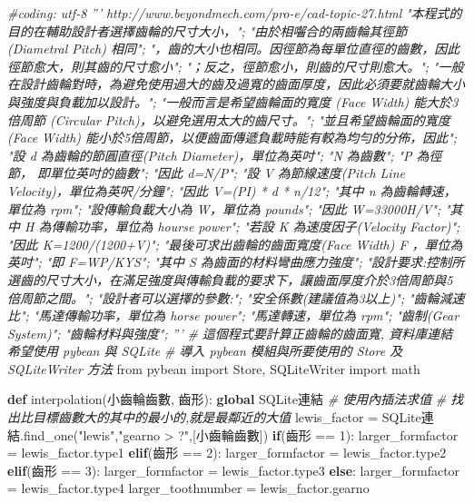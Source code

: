 \documentclass[]{article}
\newenvironment{Shaded}{}{}
\newcommand{\KeywordTok}[1]{\textcolor[rgb]{0.00,0.44,0.13}{\textbf{{#1}}}}
\newcommand{\DecValTok}[1]{\textcolor[rgb]{0.25,0.63,0.44}{{#1}}}
\newcommand{\CharTok}[1]{\textcolor[rgb]{0.25,0.44,0.63}{{#1}}}
\newcommand{\StringTok}[1]{\textcolor[rgb]{0.25,0.44,0.63}{{#1}}}
\newcommand{\CommentTok}[1]{\textcolor[rgb]{0.38,0.63,0.69}{\textit{{#1}}}}
\newcommand{\NormalTok}[1]{{#1}}
\begin{document}
\begin{Shaded}
\begin{Highlighting}[]
\CommentTok{#coding: utf-8}
\CommentTok{'''}
\CommentTok{http://www.beyondmech.com/pro-e/cad-topic-27.html}
\CommentTok{"本程式的目的在輔助設計者選擇齒輪的尺寸大小，";}
\CommentTok{"由於相囓合的兩齒輪其徑節 (Diametral Pitch) 相同";}
\CommentTok{"，齒的大小也相同。因徑節為每單位直徑的齒數，因此徑節愈大，則其齒的尺寸愈小";}
\CommentTok{"；反之，徑節愈小，則齒的尺寸則愈大。";}
\CommentTok{"一般在設計齒輪對時，為避免使用過大的齒及過寬的齒面厚度，因此必須要就齒輪大小與強度與負載加以設計。";}
\CommentTok{"一般而言是希望齒輪面的寬度 (Face Width) 能大於3倍周節 (Circular Pitch)，以避免選用太大的齒尺寸。";}
\CommentTok{"並且希望齒輪面的寬度 (Face Width) 能小於5倍周節，以便齒面傳遞負載時能有較為均勻的分佈，因此";}
\CommentTok{"設 d 為齒輪的節圓直徑(Pitch Diameter)，單位為英吋";}
\CommentTok{"N 為齒數";}
\CommentTok{"P 為徑節， 即單位英吋的齒數";}
\CommentTok{"因此 d=N/P";}
\CommentTok{"設 V 為節線速度(Pitch Line Velocity)，單位為英呎/分鐘";}
\CommentTok{"因此 V=(PI) * d * n/12";}
\CommentTok{"其中 n 為齒輪轉速，單位為 rpm";}
\CommentTok{"設傳輸負載大小為 W，單位為 pounds";}
\CommentTok{"因此 W=33000H/V";}
\CommentTok{"其中 H 為傳輸功率，單位為 hourse power";}
\CommentTok{"若設 K 為速度因子(Velocity Factor)";}
\CommentTok{"因此 K=1200/(1200+V)";}
\CommentTok{"最後可求出齒輪的齒面寬度(Face Width) F ，單位為英吋";}
\CommentTok{"即 F=WP/KYS";}
\CommentTok{"其中 S 為齒面的材料彎曲應力強度";}
\CommentTok{"設計要求:控制所選齒的尺寸大小，在滿足強度與傳輸負載的要求下，讓齒面厚度介於3倍周節與5倍周節之間。";}
\CommentTok{"設計者可以選擇的參數:";}
\CommentTok{"安全係數(建議值為3以上)";}
\CommentTok{"齒輪減速比";}
\CommentTok{"馬達傳輸功率，單位為 horse power";}
\CommentTok{"馬達轉速，單位為 rpm";}
\CommentTok{"齒制(Gear System)";}
\CommentTok{"齒輪材料與強度";}
\CommentTok{'''}
\CommentTok{# 這個程式要計算正齒輪的齒面寬, 資料庫連結希望使用 pybean 與 SQLite}
\CommentTok{# 導入 pybean 模組與所要使用的 Store 及 SQLiteWriter 方法}
\CharTok{from} \NormalTok{pybean }\CharTok{import} \NormalTok{Store, SQLiteWriter}
\CharTok{import} \NormalTok{math}

\KeywordTok{def} \NormalTok{interpolation(小齒輪齒數, 齒形):}
    \KeywordTok{global} \NormalTok{SQLite連結}
    \CommentTok{# 使用內插法求值}
    \CommentTok{# 找出比目標齒數大的其中的最小的,就是最鄰近的大值}
    \NormalTok{lewis_factor = SQLite連結.find_one(}\StringTok{"lewis"}\NormalTok{,}\StringTok{"gearno > ?"}\NormalTok{,[小齒輪齒數])}
    \KeywordTok{if}\NormalTok{(齒形 == }\DecValTok{1}\NormalTok{):}
        \NormalTok{larger_formfactor = lewis_factor.type1}
    \KeywordTok{elif}\NormalTok{(齒形 == }\DecValTok{2}\NormalTok{):}
        \NormalTok{larger_formfactor = lewis_factor.type2}
    \KeywordTok{elif}\NormalTok{(齒形 == }\DecValTok{3}\NormalTok{):}
        \NormalTok{larger_formfactor = lewis_factor.type3}
    \KeywordTok{else}\NormalTok{:}
        \NormalTok{larger_formfactor = lewis_factor.type4}
    \NormalTok{larger_toothnumber = lewis_factor.gearno}


\end{Highlighting}
\end{Shaded}
\end{document}
